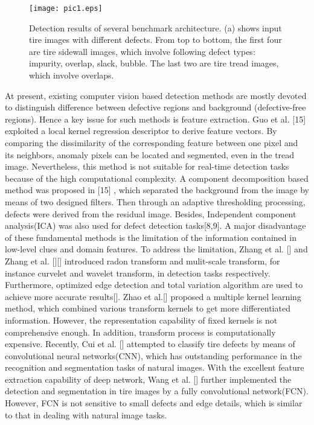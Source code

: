 \documentclass{article}
\begin{document}
\begin{figure}[t]
  \centering
  \centerline{\texttt{[image: pic1.eps]}}
  \caption{Detection results of several benchmark architecture. (a) shows input tire images with different defects. From top to bottom, the first four are tire sidewall images, which involve following defect types: impurity, overlap, slack, bubble. The last two are tire tread images, which involve overlaps. }
\end{figure} 

At present, existing computer vision based detection methods are mostly devoted to distinguish difference between defective regions and background (defective-free regions). Hence a key issue for such methods is feature extraction. Guo et al. [15] exploited a local kernel regression descriptor to derive feature vectors. By comparing the dissimilarity of the corresponding feature between one pixel and its neighbors, anomaly pixels can be located and segmented, even in the tread image. Nevertheless, this method is not suitable for real-time detection tasks because of the high computational complexity. A component decomposition based method was proposed in [15] , which separated the background from the image by means of two designed filters. Then through an adaptive thresholding processing, defects were derived from the residual image. Besides, Independent component analysis(ICA) was also used for defect detection tasks[8,9]. A major disadvantage of these fundamental methods is the limitation of the information contained in low-level clues and domain features. To address the limitation, Zhang et al. [] and Zhang et al. [][] introduced radon transform and mulit-scale transform, for instance curvelet and wavelet transform, in detection tasks respectively. Furthermore, optimized edge detection and total variation algorithm are used to achieve more accurate results[]. Zhao et al.[] proposed a multiple kernel learning method, which combined various transform kernels to get more differentiated information. However, the representation capability of fixed kernels is not comprehensive enough. In addition, transform process is computationally expensive. Recently, Cui et al. [] attempted to classify tire defects by means of convolutional neural networks(CNN), which has outstanding performance in the recognition and segmentation tasks of natural images. With the excellent feature extraction capability of deep network, Wang et al. [] further implemented the detection and segmentation in tire images by a fully convolutional network(FCN). However, FCN is not sensitive to small defects and edge details, which is similar to that in dealing with natural image tasks.
\end{document}
